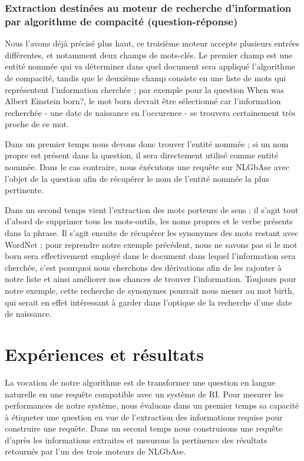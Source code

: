 \documentclass[10pt,a4paper]{article}
\begin{document}
\subsubsection{Extraction destinées au moteur de recherche d'information par algorithme de compacité (question-réponse)}
\par Nous l'avons déjà précisé plus haut, ce troisième moteur accepte plusieurs entrées différentes, et notamment deux champs de mots-clés. Le premier champ est une entité nommée qui va déterminer dans quel document sera appliqué l'algorithme de compacité, tandis que le deuxième champ consiste en une liste de mots qui représentent l'information cherchée ; par exemple pour la question \og{}When was Albert Einstein born?\fg{}, le mot \og{}born\fg{} devrait être sélectionné car l'information recherchée - une date de naissance en l'occurence - se trouvera certainement très proche de ce mot.
\par Dans un premier temps nous devons donc trouver l'entité nommée ; si un nom propre est présent dans la question, il sera directement utilisé comme entité nommée. Dans le cas contraire, nous éxécutons une requête sur NLGbAse avec l'objet de la question afin de récupérer le nom de l'entité nommée la plus pertinente. 
\par Dans un second temps vient l'extraction des mots porteurs de sens ; il s'agit tout d'abord de supprimer tous les mots-outils, les noms propres et le verbe présents dans la phrase. Il s'agit ensuite de récupérer les synonymes des mots restant avec WordNet ; pour reprendre notre exemple précédent, nous ne savons pas si le mot \og{}born\fg{} sera effectivement employé dans le document dans lequel l'information sera cherchée, c'est pourquoi nous cherchons des dérivations afin de les rajouter à notre liste et ainsi améliorer nos chances de trouver l'information. Toujours pour notre exemple, cette recherche de synonymes pourrait nous mener au mot \og{}birth\fg{}, qui serait en effet intéressant à garder dans l'optique de la recherche d'une date de naissance.


\section{Expériences et résultats}\label{experiences}

\par La vocation de notre algorithme est de transformer une question en langue naturelle en une requête compatible avec un système de RI.  Pour mesurer les performances de notre système, nous évaluons dans un premier temps sa capacité à étiqueter une question en vue de l'extraction des informations requise pour construire une requête. Dans un second temps nous construisons une requête d'après les informations extraites et mesurons la pertinence des résultats retournés par l'un des trois moteurs de NLGbAse.
\end{document}
